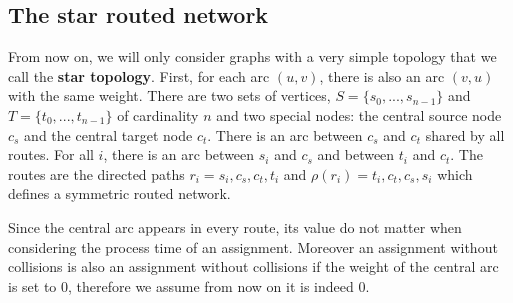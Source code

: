 \documentclass[a4paper,10pt]{article}
\begin{document}
   
    
    \subsection{The star routed network}
    
      From now on, we will only consider graphs with a very simple topology that we call the {\bf star topology}. 
      First, for each arc $(u,v)$, there is also an arc $(v,u)$ with the same weight.
      There are two sets of vertices, $S=\{s_0,...,s_{n-1}\}$ and $T=\{t_0,...,t_{n-1}\}$ of cardinality $n$ and two special nodes:
      the central source node {\bf $c_s$} and the central target node {\bf $c_t$}. There is an arc between {\bf $c_s$} and {\bf $c_t$} shared by all routes. For all $i$, there is an arc between $s_i$ and $c_s$ and between $t_i$ and $c_t$.
      The routes are the directed paths $r_i = s_i,c_s,c_t,t_i$ and $\rho(r_i) = t_i,c_t,c_s,s_i$ which defines a 
      symmetric routed network. 
      
      
       \begin{center}

  \end{center}
	
      Since the central arc appears in every route, its value do not matter when considering the process time of an assignment.
      Moreover an assignment without collisions is also an assignment without collisions if the weight of the central arc 
      is set to $0$, therefore we assume from now on it is indeed $0$.
      
\end{document}
